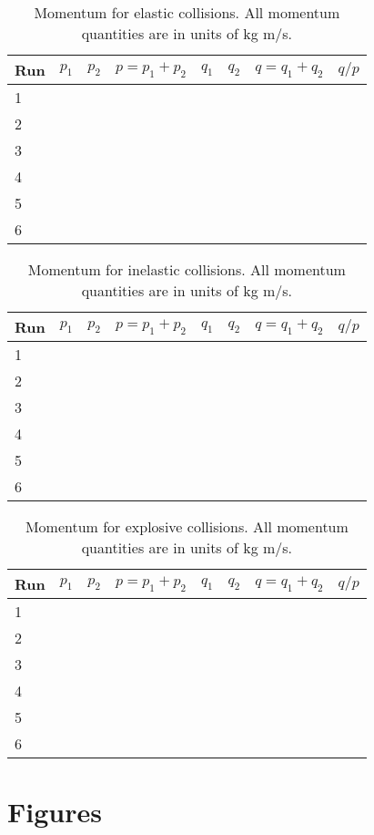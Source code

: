 \begin{table}[ht]
    \centering
    \begin{tabular}{|l|r|r|r|r|r|r|r|}
        \hline
        Run & $p_{1}$ & $p_{2}$ & $p = p_{1} + p_{2}$ & $q_{1}$ & $q_{2}$ & $q = q_{1} + q_{2}$ & $q / p$ \\
        \hline
        1 & & & & & & & \\
        2 & & & & & & & \\
        3 & & & & & & & \\
        4 & & & & & & & \\
        5 & & & & & & & \\
        6 & & & & & & & \\
        \hline
    \end{tabular}
    \caption{Momentum for elastic collisions. All momentum quantities are in units of kg m/s.}
    \label{09:table.p.elastic}
\end{table}
\begin{table}[ht]
    \centering
    \begin{tabular}{|l|r|r|r|r|r|r|r|}
        \hline
        Run & $p_{1}$ & $p_{2}$ & $p = p_{1} + p_{2}$ & $q_{1}$ & $q_{2}$ & $q = q_{1} + q_{2}$ & $q / p$ \\
        \hline
        1 & & & & & & & \\
        2 & & & & & & & \\
        3 & & & & & & & \\
        4 & & & & & & & \\
        5 & & & & & & & \\
        6 & & & & & & & \\
        \hline
    \end{tabular}
    \caption{Momentum for inelastic collisions. All momentum quantities are in units of kg m/s.}
    \label{09:table.p.inelastic}
\end{table}
\begin{table}[ht]
    \centering
    \begin{tabular}{|l|r|r|r|r|r|r|r|}
        \hline
        Run & $p_{1}$ & $p_{2}$ & $p = p_{1} + p_{2}$ & $q_{1}$ & $q_{2}$ & $q = q_{1} + q_{2}$ & $q / p$ \\
        \hline
        1 & & & & & & & \\
        2 & & & & & & & \\
        3 & & & & & & & \\
        4 & & & & & & & \\
        5 & & & & & & & \\
        6 & & & & & & & \\
        \hline
    \end{tabular}
    \caption{Momentum for explosive collisions. All momentum quantities are in units of kg m/s.}
    \label{09:table.p.explosive}
\end{table}
\FloatBarrier
\newpage
\section{Figures}
